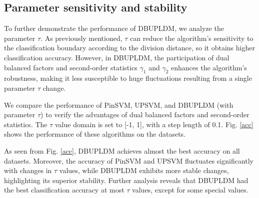 \documentclass[a4paper]{cas-sc}
\begin{document}


\subsection{Parameter sensitivity and stability}
\label{para_sen}
To further demonstrate the performance of DBUPLDM, we analyze the parameter $\tau$. As previously mentioned, $\tau$ can reduce the algorithm's sensitivity to the classification boundary according to the division distance, so it obtains higher classification accuracy. However, in DBUPLDM, the participation of dual balanced factors and second-order statistics $\gamma_{1}$ and $\gamma_{2}$ enhances the algorithm's robustness, making it less susceptible to huge fluctuations resulting from a single parameter $ \tau$ change.

We compare the performance of PinSVM, UPSVM, and DBUPLDM (with parameter $\tau$) to verify the advantages of dual balanced factors and second-order statistics. The $\tau$ value domain is set to [-1, 1], with a step length of 0.1. Fig. \ref{acc} shows the performance of these algorithms on the datasets.

As seen from Fig. \ref{acc}, DBUPLDM achieves almost the best accuracy on all datasets. Moreover, the accuracy of PinSVM and UPSVM fluctuates significantly with changes in $\tau$ values, while DBUPLDM exhibits more stable changes, highlighting its superior stability. Further analysis reveals that DBUPLDM had the best classification accuracy at most $\tau$ values, except for some special values.
\end{document}
